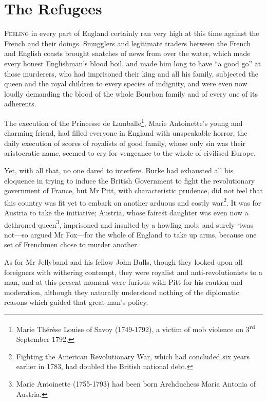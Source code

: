 
\chapter{The Refugees}
\lettrine[lines=4]{F}{eeling} in every part of England certainly ran very high at this time against the French and their doings. Smugglers and legitimate traders between the French and English coasts brought snatches of news from over the water, which made every honest Englishman's blood boil, and made him long to have \enquote{a good go} at those murderers, who had imprisoned their king and all his family, subjected the queen and the royal children to every species of indignity, and were even now loudly demanding the blood of the whole Bourbon family and of every one of its adherents.

The execution of the Princesse de Lamballe\footnote{Marie Thérèse Louise of Savoy (1749-1792), a victim of mob violence on 3\textsuperscript{rd} September 1792.}, Marie Antoinette's young and charming friend, had filled everyone in England with unspeakable horror, the daily execution of scores of royalists of good family, whose only sin was their aristocratic name, seemed to cry for vengeance to the whole of civilised Europe.

Yet, with all that, no one dared to interfere. Burke had exhausted all his eloquence in trying to induce the British Government to fight the revolutionary government of France, but Mr Pitt, with characteristic prudence, did not feel that this country was fit yet to embark on another arduous and costly war\footnote{Fighting the American Revolutionary War, which had concluded six years earlier in 1783, had doubled the British national debt.}. It was for Austria to take the initiative; Austria, whose fairest daughter was even now a dethroned queen\footnote{Marie Antoinette (1755-1793) had been born Archduchess Maria Antonia of Austria.}, imprisoned and insulted by a howling mob; and surely `twas not---so argued Mr Fox---for the whole of England to take up arms, because one set of Frenchmen chose to murder another.

As for Mr Jellyband and his fellow John Bulls, though they looked upon all foreigners with withering contempt, they were royalist and anti-revolutionists to a man, and at this present moment were furious with Pitt for his caution and moderation, although they naturally understood nothing of the diplomatic reasons which guided that great man's policy.

